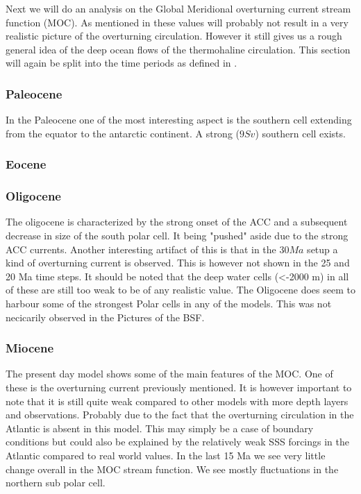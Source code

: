 Next we will do an analysis on the Global Meridional overturning current stream function (MOC). As mentioned in  these values will probably not result in a very realistic picture of the overturning circulation. However it still gives us a rough general idea of the deep ocean flows of the thermohaline circulation. This section will again be split into the time periods as defined in .

\subsubsection{Paleocene}
In the Paleocene one of the most interesting aspect is the southern cell extending from the equator to the antarctic continent. A strong ($9 Sv$) southern cell exists. 

\subsubsection{Eocene}

\subsubsection{Oligocene}
The oligocene is characterized by the strong onset of the ACC and a subsequent decrease in size of the south polar cell. It being "pushed" aside due to the strong ACC currents. Another interesting artifact of this is that in the $30 Ma$ setup a kind of overturning current is observed. This is however not shown in the 25 and 20 Ma time steps. It should be noted that the deep water cells (<-2000 m) in all of these are still too weak to be of any realistic value. The Oligocene does seem to harbour some of the strongest Polar cells in any of the models. This was not necicarily observed in the Pictures of the BSF.

\subsubsection{Miocene}

The present day model shows some of the main features of the MOC. One of these is the overturning current previously mentioned. It is however important to note that it is still quite weak compared to other models with more depth layers and observations. Probably due to the fact that the overturning circulation in the Atlantic is absent in this model. This may simply be a case of boundary conditions but could also be explained by the relatively weak SSS forcings in the Atlantic compared to real world values. In the last 15 Ma we see very little change overall in the MOC stream function. We see mostly fluctuations in the northern sub polar cell. 